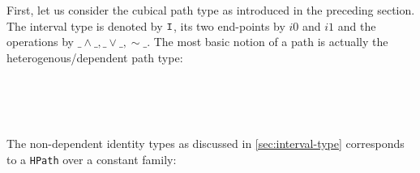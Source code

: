 First, let us consider the cubical path type as introduced in the preceding
section. The interval type is denoted by $\texttt{I}$, its two end-points by $i0$ and
$i1$ and the operations by $\_\land\_, \_\lor\_, \sim\_$. The most basic notion
of a path is actually the heterogenous/dependent path type:
\begin{code}[hide]%
\>[0]\AgdaSpace{}%
\AgdaSpace{}%
\<%
\\
\>[0]\<%
\\
\>[0][@{}l@{\AgdaIndent{0}}]%
\>[2]\AgdaSpace{}%
\AgdaSymbol{:}\AgdaSpace{}%
\<%
\\
\>[0]\<%
\end{code}
\begin{code}%
\>[0][@{}l@{\AgdaIndent{1}}]%
\>[2]\AgdaSpace{}%
\AgdaSymbol{:}\AgdaSpace{}%
\AgdaSymbol{(}\AgdaSpace{}%
\AgdaSymbol{:}\AgdaSpace{}%
\AgdaSpace{}%
\AgdaSpace{}%
\AgdaSymbol{)}\AgdaSpace{}%
\AgdaSpace{}%
\AgdaSpace{}%
\AgdaSpace{}%
\AgdaSpace{}%
\AgdaSpace{}%
\AgdaSpace{}%
\AgdaSpace{}%
\<%
\end{code}
The non-dependent identity types as discussed in \autoref{sec:interval-type}
corresponds to a \texttt{HPath} over a constant family:
\begin{code}%
\>[0]\AgdaSpace{}%
\AgdaSymbol{:}\AgdaSpace{}%
\AgdaSymbol{\{}\AgdaSpace{}%
\AgdaSymbol{:}\AgdaSpace{}%
\AgdaSymbol{\}}\AgdaSpace{}%
\AgdaSpace{}%
\AgdaSpace{}%
\AgdaSpace{}%
\AgdaSpace{}%
\AgdaSpace{}%
\<%
\\
\>[0]\AgdaSpace{}%
\AgdaSymbol{\{}\AgdaSymbol{\}}\AgdaSpace{}%
\AgdaSpace{}%
\AgdaSpace{}%
\AgdaSymbol{=}\AgdaSpace{}%
\AgdaSpace{}%
\AgdaSpace{}%
\AgdaBound{\AgdaUnderscore{}}\AgdaSpace{}%
\AgdaSpace{}%
\AgdaSymbol{)}\AgdaSpace{}%
\AgdaSpace{}%
\<%
\end{code}

